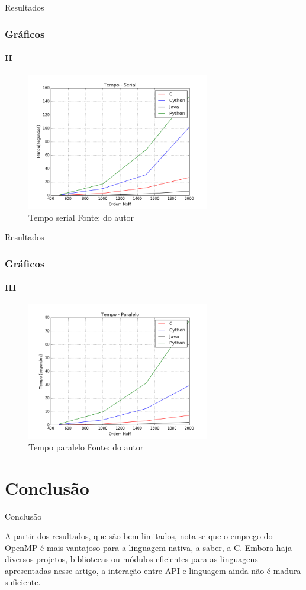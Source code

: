 \documentclass[aspectratio=169]{beamer}
\begin{document}
\begin{frame}{Resultados}
\frametitle{Gráficos}
\framesubtitle{II}

\begin{figure}
  \centering
  \includegraphics[width=8cm]{pictures/tempo_serial.png}
  \caption{Tempo serial {\small Fonte: do autor}}
\end{figure}

\end{frame}

\begin{frame}{Resultados}
\frametitle{Gráficos}
\framesubtitle{III}

\begin{figure}
  \centering
  \includegraphics[width=8cm]{pictures/tempo_paralelo.png}
  \caption{Tempo paralelo {\small Fonte: do autor}}
\end{figure}

\end{frame}


\section{Conclusão}
\begin{frame}{Conclusão}

A partir dos resultados, que são bem limitados, nota-se que o emprego do OpenMP é mais vantajoso para a linguagem nativa, a saber, a C. Embora haja diversos projetos, bibliotecas ou módulos eficientes para as linguagens apresentadas nesse artigo, a interação entre API e linguagem ainda não é madura suficiente.

\end{frame}
\end{document}
